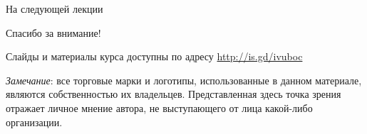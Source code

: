 \documentclass{beamer}
\begin{document}
\begin{frame}{На следующей лекции}
\centering


\end{frame}


\begin{frame}

{\huge{Спасибо за внимание!}\par}

\vfill

Слайды и материалы курса доступны по адресу \url{http://is.gd/ivuboc} %

\vfill

\tiny{\textit{Замечание}: все торговые марки и логотипы, использованные в данном материале, являются собственностью их владельцев. Представленная здесь точка зрения отражает личное мнение автора, не выступающего от лица какой-либо организации.}

\end{frame}
\end{document}
